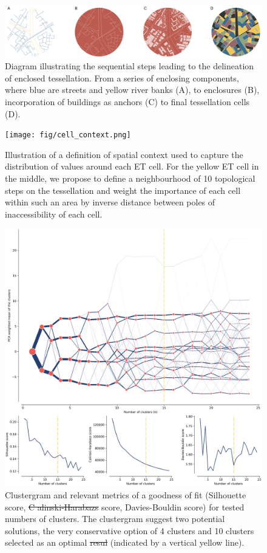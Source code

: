 \documentclass[fleqn,10pt]{wlscirep}
\providecommand{\DIFadd}[1]{{\protect\color{blue}\uwave{#1}}} %
\providecommand{\DIFdel}[1]{{\protect\color{red}\sout{#1}}}                      %
\providecommand{\DIFaddFL}[1]{\DIFadd{#1}} %
\providecommand{\DIFdelFL}[1]{\DIFdel{#1}} %
\providecommand{\DIFaddbeginFL}{} %
\providecommand{\DIFaddendFL}{} %
\providecommand{\DIFdelbeginFL}{} %
\providecommand{\DIFdelendFL}{} %
\begin{document}
\begin{figure}[ht]
    \includegraphics[width=\linewidth]{fig/et_diagram.pdf}
    \caption{Diagram illustrating the sequential steps leading to the delineation of
    enclosed tessellation. From a series of enclosing components, where blue are streets
    and yellow river banks (A), to enclosures (B), incorporation of buildings as anchors
    (C) to final tessellation cells (D).}
    \label{fig:et_diagram}
\end{figure}

\begin{figure}[ht]
    \centering
    \texttt{[image: fig/cell\_context.png]}
    \caption{Illustration of a definition of spatial context used to capture the
    distribution of values around each ET cell. For the yellow ET cell in the middle,
    we propose to define a neighbourhood of 10 topological steps on the tessellation
    and weight the importance of each cell within such an area by inverse distance
    between poles of inaccessibility of each cell.}
    \label{fig:context}
\end{figure}

\begin{figure}[ht]
    \centering
    \includegraphics[width=.8\linewidth]{fig/clustergram.png}
    \caption{Clustergram and relevant metrics of a goodness of fit (Silhouette score,
    \DIFdelbeginFL \DIFdelFL{C
    alinski-Harabazs }\DIFdelendFL \DIFaddbeginFL \DIFaddFL{Calinski-Harabazs }\DIFaddendFL score, Davies-Bouldin score) for tested numbers of clusters. The
    clustergram suggest two potential solutions, the very conservative option of 4
    clusters and 10 clusters selected as an optimal \DIFdelbeginFL \DIFdelFL{resul }\DIFdelendFL \DIFaddbeginFL \DIFaddFL{result }\DIFaddendFL (indicated by a vertical yellow line).}
    \label{fig:clustergram}
\end{figure}
\end{document}
